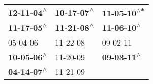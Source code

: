 \begin{supertabular}{lll}
 \textbf{12-11-04\textsuperscript{$\wedge$}} &  \textbf{10-17-07\textsuperscript{$\wedge$}} &  \textbf{11-05-10\textsuperscript{$\wedge$*}} \\
 \textbf{11-17-05\textsuperscript{$\wedge$}} &  \textbf{11-21-08\textsuperscript{$\wedge$}} &   \textbf{11-06-10\textsuperscript{$\wedge$}} \\
                  05-04-06\textsuperscript{} &                   11-22-08\textsuperscript{} &                    09-02-11\textsuperscript{} \\
 \textbf{10-05-06\textsuperscript{$\wedge$}} &                   11-20-09\textsuperscript{} &   \textbf{09-03-11\textsuperscript{$\wedge$}} \\
 \textbf{04-14-07\textsuperscript{$\wedge$}} &                   11-21-09\textsuperscript{} &                                               \\
\end{supertabular}
